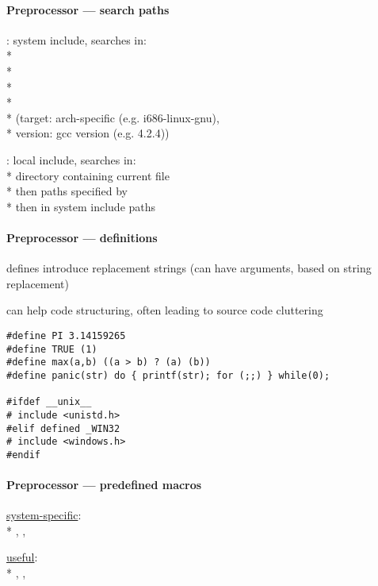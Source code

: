 \paragraph{Preprocessor --- search paths}
\begin{items}
  \item {}: system include, searches in: \\*
     \\*
     \\*
     \\*
     \\*
    (target: arch-specific (e.g. i686-linux-gnu), \\*
    \phantom{x} version: gcc version (e.g. 4.2.4))
  \item {}: local include, searches in: \\*
    directory containing current file \\*
    then paths specified by  \\*
    then in system include paths
\end{items}

\paragraph{Preprocessor --- definitions}
\begin{items}
  \item defines introduce replacement strings (can have arguments, based on string replacement)
  \item can help code structuring, often leading to source code cluttering
\end{items}
\begin{lstlisting}[style=customc]
#define PI 3.14159265
#define TRUE (1)
#define max(a,b) ((a > b) ? (a) (b))
#define panic(str) do { printf(str); for (;;) } while(0);

#ifdef __unix__
# include <unistd.h>
#elif defined _WIN32
# include <windows.h>
#endif
\end{lstlisting}

\paragraph{Preprocessor --- predefined macros}
\begin{items}
  \item \underline{system-specific}: \\*
    , , 
  \item \underline{useful}: \\*
    , , 
\end{items}

